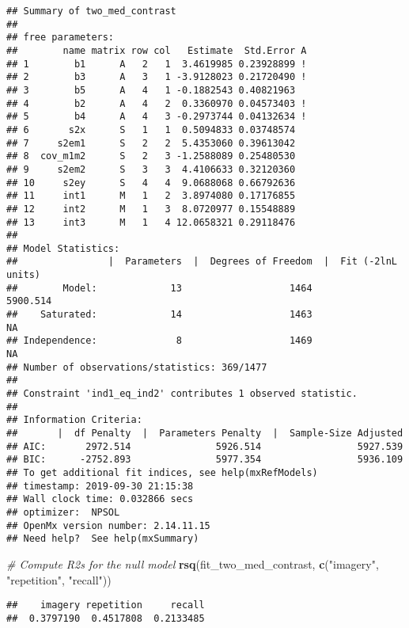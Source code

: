 \documentclass[11pt,]{article}
\newenvironment{Shaded}{\begin{snugshade}}{\end{snugshade}}
\newcommand{\CommentTok}[1]{\textcolor[rgb]{0.56,0.35,0.01}{\textit{#1}}}
\newcommand{\KeywordTok}[1]{\textcolor[rgb]{0.13,0.29,0.53}{\textbf{#1}}}
\newcommand{\NormalTok}[1]{#1}
\newcommand{\StringTok}[1]{\textcolor[rgb]{0.31,0.60,0.02}{#1}}
\begin{document}
\begin{verbatim}
## Summary of two_med_contrast 
##  
## free parameters:
##        name matrix row col   Estimate  Std.Error A
## 1        b1      A   2   1  3.4619985 0.23928899 !
## 2        b3      A   3   1 -3.9128023 0.21720490 !
## 3        b5      A   4   1 -0.1882543 0.40821963  
## 4        b2      A   4   2  0.3360970 0.04573403 !
## 5        b4      A   4   3 -0.2973744 0.04132634 !
## 6       s2x      S   1   1  0.5094833 0.03748574  
## 7     s2em1      S   2   2  5.4353060 0.39613042  
## 8  cov_m1m2      S   2   3 -1.2588089 0.25480530  
## 9     s2em2      S   3   3  4.4106633 0.32120360  
## 10     s2ey      S   4   4  9.0688068 0.66792636  
## 11     int1      M   1   2  3.8974080 0.17176855  
## 12     int2      M   1   3  8.0720977 0.15548889  
## 13     int3      M   1   4 12.0658321 0.29118476  
## 
## Model Statistics: 
##                |  Parameters  |  Degrees of Freedom  |  Fit (-2lnL units)
##        Model:             13                   1464              5900.514
##    Saturated:             14                   1463                    NA
## Independence:              8                   1469                    NA
## Number of observations/statistics: 369/1477
## 
## Constraint 'ind1_eq_ind2' contributes 1 observed statistic. 
## 
## Information Criteria: 
##       |  df Penalty  |  Parameters Penalty  |  Sample-Size Adjusted
## AIC:       2972.514               5926.514                 5927.539
## BIC:      -2752.893               5977.354                 5936.109
## To get additional fit indices, see help(mxRefModels)
## timestamp: 2019-09-30 21:15:38 
## Wall clock time: 0.032866 secs 
## optimizer:  NPSOL 
## OpenMx version number: 2.14.11.15 
## Need help?  See help(mxSummary)
\end{verbatim}

\begin{Shaded}
\begin{Highlighting}[]
\CommentTok{# Compute R2s for the null model}
\KeywordTok{rsq}\NormalTok{(fit_two_med_contrast, }\KeywordTok{c}\NormalTok{(}\StringTok{"imagery"}\NormalTok{, }\StringTok{"repetition"}\NormalTok{, }\StringTok{"recall"}\NormalTok{))}
\end{Highlighting}
\end{Shaded}

\begin{verbatim}
##    imagery repetition     recall 
##  0.3797190  0.4517808  0.2133485
\end{verbatim}
\end{document}
